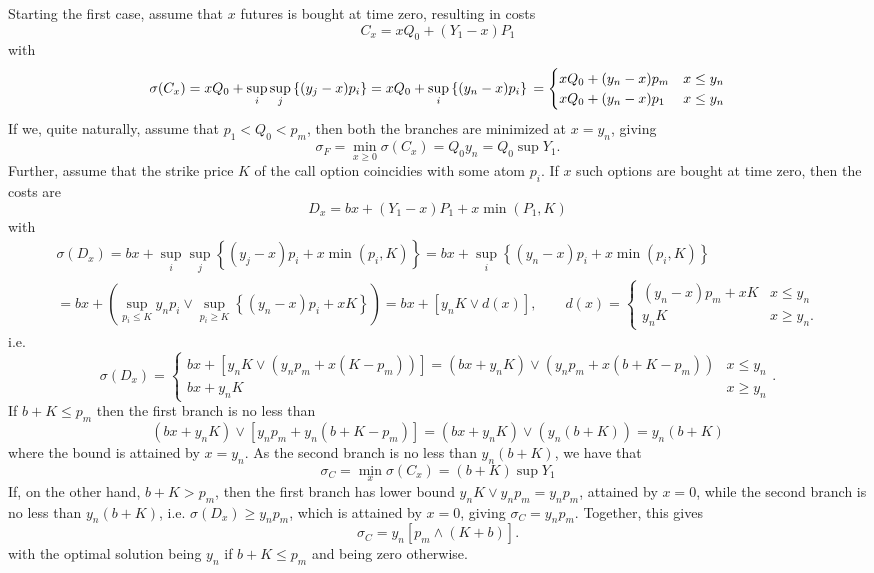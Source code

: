 \documentclass[3p,times]{elsarticle}
\begin{document}
Starting the first case, assume that $x$ futures is bought at time zero, resulting in costs 
$$
C_x = x Q_0+(Y_1-x) P_1
$$
with
$$
\sigma(C_x)=x Q_0 + \sup_{i} \sup_j \left\{ (y_j-x) p_i \right\}
=x Q_0 + \sup_{i} \left\{ (y_n-x) p_i \right\}
\\
=\begin{cases}
x Q_0 + (y_n-x) p_m & x \leq y_n\\
x Q_0 + (y_n-x) p_1 & x \leq y_n\\
\end{cases}
$$
If we, quite naturally, assume that $p_1 < Q_0 < p_m$, then both the branches are minimized at $x=y_n$, giving 
$$\sigma_F=\min_{x\geq 0}\sigma(C_x)= Q_0y_n=Q_0\sup Y_1.$$
Further, assume that the strike price $K$ of the call option coincidies with some atom $p_i$. If $x$ such options are bought at time zero, then the costs are
$$
D_x = bx + (Y_1-x)P_1 + x \min(P_1,K) 
$$
with 
\begin{multline*}
\sigma(D_x)=bx +\sup_{i} \sup_j \left\{ (y_j-x) p_i + x \min(p_i,K)\right\} 
=
bx +\sup_{i} \left\{ (y_n-x) p_i + x \min(p_i,K)\right\} 
\\
=bx +\left(\sup_{p_i \leq K } 
y_np_i
\vee
\sup_{p_i \geq K } 
\left\{ (y_n-x) p_i + x K\right\}
 \right)
=b x +  
\left[y_n K \vee d(x)\right],
\qquad  
d(x)=\begin{cases}
(y_n-x) p_m + xK
& x \leq y_n \\
y_n K & x \geq y_n.
\end{cases}
\end{multline*}
i.e.
$$
\sigma(D_x)=
\begin{cases}
 bx + [y_n K \vee (y_n p_m + x(K-p_m))] =  (bx +y_n K) \vee (y_n p_m + x(b+K-p_m)) & x \leq y_n\\
 b x + y_n K & x \geq y_n
 \end{cases}.
$$
If $b + K \leq p_m $ then the first branch is no less than
$$(bx +y_n K) \vee [y_n p_m + y_n(b+K-p_m)]=(bx +y_n K) \vee (y_n(b+K)) 
=y_n(b+K)
$$
where the bound is attained by $x=y_n$. As the second branch is no less than 
$y_n(b +K)$, we have that 
$$
\sigma_C=\min_x \sigma(C_x)=(b+K)\sup Y_1
$$
If, on the other hand, $b + K> p_m $, then the first branch has lower bound $y_n K \vee y_n p_m=y_n p_m$, attained by $x=0$, while the second branch is no less than $y_n(b+K)$, i.e. $\sigma(D_x) \geq y_n p_m$, which is attained by $x=0$, giving
$
\sigma_C=y_np_m$. Together, this gives
$$
\sigma_C=y_n[p_m \wedge (K + b)].
$$
with the optimal solution being $y_n$ if $b + K \leq p_m$ and being zero otherwise.
\end{document}
